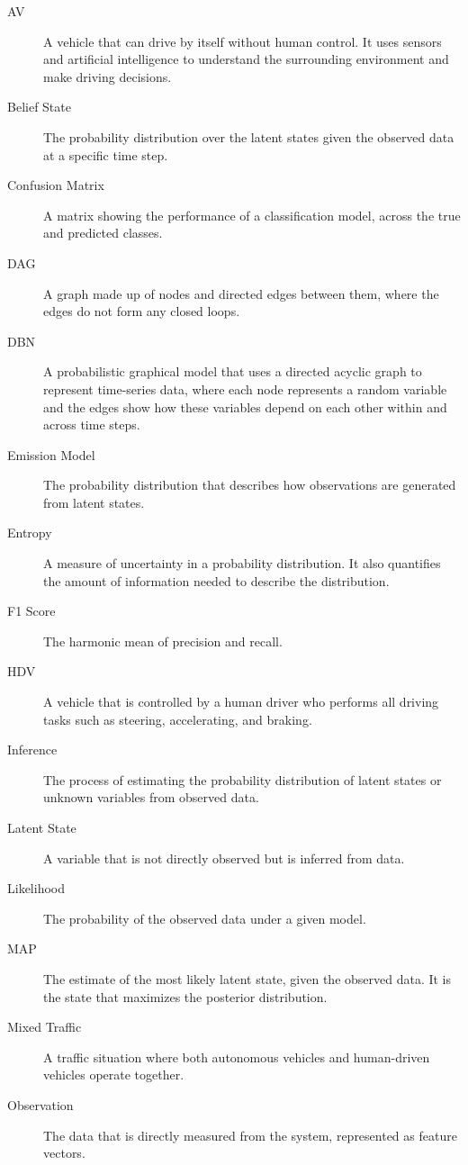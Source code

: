 \cleardoublepage
{}

\begin{description}
    \item [\ac{AV}] A vehicle that can drive by itself without human control. It uses sensors and artificial intelligence to understand the surrounding environment and make driving decisions.
    \item [Belief State] The probability distribution over the latent states given the observed data at a specific time step.
    \item [Confusion Matrix] A matrix showing the performance of a classification model, across the true and predicted classes.
    \item [\ac{DAG}] A graph made up of nodes and directed edges between them, where the edges do not form any closed loops.
    \item [\ac{DBN}] A probabilistic graphical model that uses a directed acyclic graph to represent time-series data, where each node represents a random variable and the edges show how these variables depend on each other within and across time steps.
    \item [Emission Model] The probability distribution that describes how observations are generated from latent states.
    \item [Entropy] A measure of uncertainty in a probability distribution. It also quantifies the amount of information needed to describe the distribution.
    \item [F1 Score] The harmonic mean of precision and recall.
    \item [\ac{HDV}] A vehicle that is controlled by a human driver who performs all driving tasks such as steering, accelerating, and braking.
    \item [Inference] The process of estimating the probability distribution of latent states or unknown variables from observed data.
    \item [Latent State] A variable that is not directly observed but is inferred from data.
    \item [Likelihood] The probability of the observed data under a given model.
    \item [\ac{MAP}] The estimate of the most likely latent state, given the observed data. It is the state that maximizes the posterior distribution.
    \item [Mixed Traffic] A traffic situation where both autonomous vehicles and human-driven vehicles operate together.
    \item [Observation] The data that is directly measured from the system, represented as feature vectors. 

\end{description}

